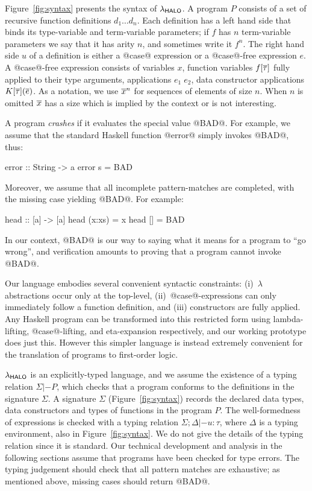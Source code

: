 Figure~\ref{fig:syntax} presents the syntax of $\lambda_{\sf HALO}$.  A program
$P$ consists of a set of recursive function definitions $d_1 \ldots
d_n$. Each definition has a left hand side that binds its type-variable and
term-variable parameters;
if $f$ has $n$ term-variable parameters we say that
it has arity $n$, and sometimes write it $f^n$.
The right hand side $u$ of a definition is either a @case@ expression or a
@case@-free expression $e$.  A @case@-free expression consists of
variables $x$, function variables $f[\overline{\tau}]$ fully applied to their
type arguments, applications $e_1\;e_2$, data constructor applications
$K[\overline{\tau}](\overline{e})$. As a notation, we use
$\overline{x}^{n}$ for sequences of elements of size $n$. When $n$ is
omitted $\overline{x}$ has a size which is implied by the context or is not
interesting.

A program \emph{crashes} if it evaluates the special value @BAD@.
For example, we assume that the standard Haskell function @error@
simply invokes @BAD@, thus:
\begin{code}
  error :: String -> a
  error s = BAD
\end{code}
Moreover, we assume that all incomplete pattern-matches are completed, with the
missing case yielding @BAD@.  For example:
\begin{code}
  head :: [a] -> [a]
  head (x:xs) = x
  head []     = BAD
\end{code}
In our context, @BAD@ is our way to saying what it means for a program to ``go wrong'',
and verification amounts to proving that a program cannot invoke @BAD@.

Our language embodies several convenient syntactic constraints:
(i)~$\lambda$ abstractions occur only at the top-level,
(ii)~@case@-expressions can only immediately follow a function
definition, and (iii) constructors are fully applied.
Any Haskell program can be transformed into this restricted
form using lambda-lifting, @case@-lifting, and eta-expansion respectively,
and our working prototype does just this.
However this simpler language is instead extremely
convenient for the translation of programs to first-order logic.

$\lambda_{\sf HALO}$ is an explicitly-typed language, and we assume the existence
of a typing relation $\Sigma |- P$, which checks that a program
conforms to the definitions in the signature $\Sigma$. A signature
$\Sigma$ (Figure~\ref{fig:syntax}) records the declared data types,
data constructors and types of functions in the program $P$. The
well-formedness of expressions is checked with a typing relation
$\Sigma;\Delta |- u : \tau$, where $\Delta$ is a typing environment,
also in Figure~\ref{fig:syntax}.  We do not give the details of the
typing relation since it is standard.
Our technical development and analysis in the following sections
assume that programs have been checked for type errors.
The typing judgement should check that all pattern matches are
exhaustive; as mentioned above, missing cases should return @BAD@.


